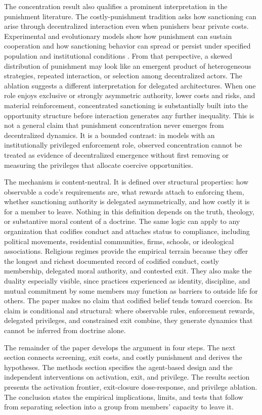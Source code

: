 The concentration result also qualifies a prominent interpretation in the punishment literature. The costly-punishment tradition asks how sanctioning can arise through decentralized interaction even when punishers bear private costs. Experimental and evolutionary models show how punishment can sustain cooperation and how sanctioning behavior can spread or persist under specified population and institutional conditions \citep{fehrgachter2000,boydgintisbowles2010,hauertetal2007}. From that perspective, a skewed distribution of punishment may look like an emergent product of heterogeneous strategies, repeated interaction, or selection among decentralized actors. The ablation suggests a different interpretation for delegated architectures. When one role enjoys exclusive or strongly asymmetric authority, lower costs and risks, and material reinforcement, concentrated sanctioning is substantially built into the opportunity structure before interaction generates any further inequality. This is not a general claim that punishment concentration never emerges from decentralized dynamics. It is a bounded contrast: in models with an institutionally privileged enforcement role, observed concentration cannot be treated as evidence of decentralized emergence without first removing or measuring the privileges that allocate coercive opportunities.

The mechanism is content-neutral. It is defined over structural properties: how observable a code's requirements are, what rewards attach to enforcing them, whether sanctioning authority is delegated asymmetrically, and how costly it is for a member to leave. Nothing in this definition depends on the truth, theology, or substantive moral content of a doctrine. The same logic can apply to any organization that codifies conduct and attaches status to compliance, including political movements, residential communities, firms, schools, or ideological associations. Religious regimes provide the empirical terrain because they offer the longest and richest documented record of codified conduct, costly membership, delegated moral authority, and contested exit. They also make the duality especially visible, since practices experienced as identity, discipline, and mutual commitment by some members may function as barriers to outside life for others. The paper makes no claim that codified belief tends toward coercion. Its claim is conditional and structural: where observable rules, enforcement rewards, delegated privileges, and constrained exit combine, they generate dynamics that cannot be inferred from doctrine alone.

The remainder of the paper develops the argument in four steps. The next section connects screening, exit costs, and costly punishment and derives the hypotheses. The methods section specifies the agent-based design and the independent interventions on activation, exit, and privilege. The results section presents the activation frontier, exit-closure dose-response, and privilege ablation. The conclusion states the empirical implications, limits, and tests that follow from separating selection into a group from members' capacity to leave it.

